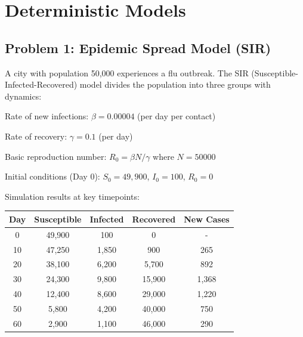 \documentclass[12pt]{article}
\begin{document}
\section{Deterministic Models}

\subsection*{Problem 1: Epidemic Spread Model (SIR)}

A city with population 50,000 experiences a flu outbreak. The SIR (Susceptible-Infected-Recovered) model divides the population into three groups with dynamics:

Rate of new infections: $\beta = 0.00004$ (per day per contact)

Rate of recovery: $\gamma = 0.1$ (per day)

Basic reproduction number: $R_0 = \beta N / \gamma$ where $N = 50000$

Initial conditions (Day 0): $S_0 = 49,900$, $I_0 = 100$, $R_0 = 0$

Simulation results at key timepoints:

\begin{center}
\begin{tabular}{ccccc}
\toprule
Day & Susceptible & Infected & Recovered & New Cases \\
\midrule
0 & 49,900 & 100 & 0 & - \\
10 & 47,250 & 1,850 & 900 & 265 \\
20 & 38,100 & 6,200 & 5,700 & 892 \\
30 & 24,300 & 9,800 & 15,900 & 1,368 \\
40 & 12,400 & 8,600 & 29,000 & 1,220 \\
50 & 5,800 & 4,200 & 40,000 & 750 \\
60 & 2,900 & 1,100 & 46,000 & 290 \\
\bottomrule
\end{tabular}
\end{center}
\end{document}
